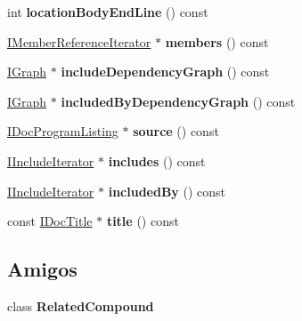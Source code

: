 \begin{DoxyCompactItemize}
\item 
\hypertarget{class_compound_handler_ac49937c48951825a63fa00a14204966d}{int {\bfseries location\-Body\-End\-Line} () const }\label{class_compound_handler_ac49937c48951825a63fa00a14204966d}

\item 
\hypertarget{class_compound_handler_a200d07c3abf67b299e7945b68c91328a}{\hyperlink{class_i_member_reference_iterator}{I\-Member\-Reference\-Iterator} $\ast$ {\bfseries members} () const }\label{class_compound_handler_a200d07c3abf67b299e7945b68c91328a}

\item 
\hypertarget{class_compound_handler_a03cb0e384c809a400b18e63a73f88dc3}{\hyperlink{class_i_graph}{I\-Graph} $\ast$ {\bfseries include\-Dependency\-Graph} () const }\label{class_compound_handler_a03cb0e384c809a400b18e63a73f88dc3}

\item 
\hypertarget{class_compound_handler_a93601429d19d844e63d5934e5290daf8}{\hyperlink{class_i_graph}{I\-Graph} $\ast$ {\bfseries included\-By\-Dependency\-Graph} () const }\label{class_compound_handler_a93601429d19d844e63d5934e5290daf8}

\item 
\hypertarget{class_compound_handler_a2f9218d5099157ec6a7bfaa51d799be8}{\hyperlink{class_i_doc_program_listing}{I\-Doc\-Program\-Listing} $\ast$ {\bfseries source} () const }\label{class_compound_handler_a2f9218d5099157ec6a7bfaa51d799be8}

\item 
\hypertarget{class_compound_handler_a492563e0f76df4ed8f925ffd20591d15}{\hyperlink{class_i_include_iterator}{I\-Include\-Iterator} $\ast$ {\bfseries includes} () const }\label{class_compound_handler_a492563e0f76df4ed8f925ffd20591d15}

\item 
\hypertarget{class_compound_handler_a1918ab4e5d66e9504d30a40ca5515358}{\hyperlink{class_i_include_iterator}{I\-Include\-Iterator} $\ast$ {\bfseries included\-By} () const }\label{class_compound_handler_a1918ab4e5d66e9504d30a40ca5515358}

\item 
\hypertarget{class_compound_handler_af0e7a53674849f59096520180b37c7e1}{const \hyperlink{class_i_doc_title}{I\-Doc\-Title} $\ast$ {\bfseries title} () const }\label{class_compound_handler_af0e7a53674849f59096520180b37c7e1}

\end{DoxyCompactItemize}
\subsection*{Amigos}
\begin{DoxyCompactItemize}
\item 
\hypertarget{class_compound_handler_a3ac82494777760c5bf9d85209ba95321}{class {\bfseries Related\-Compound}}\label{class_compound_handler_a3ac82494777760c5bf9d85209ba95321}

\end{DoxyCompactItemize}
